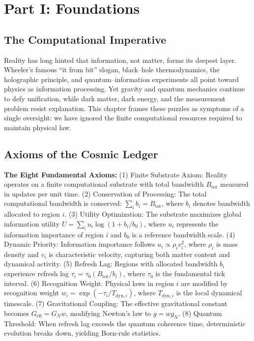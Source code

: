 \documentclass[12pt,letterpaper]{article}
\begin{document}
\tableofcontents

\section{Part I: Foundations}

\subsection{The Computational Imperative}
Reality has long hinted that information, not matter, forms its deepest layer. Wheeler's famous ``it from bit'' slogan, black--hole thermodynamics, the holographic principle, and quantum--information experiments all point toward physics as information processing. Yet gravity and quantum mechanics continue to defy unification, while dark matter, dark energy, and the measurement problem resist explanation. This chapter frames these puzzles as symptoms of a single oversight: we have ignored the finite computational resources required to maintain physical law.

\subsection{Axioms of the Cosmic Ledger}

\textbf{The Eight Fundamental Axioms:} (1) Finite Substrate Axiom: Reality operates on a finite computational substrate with total bandwidth $B_{\text{tot}}$ measured in updates per unit time. (2) Conservation of Processing: The total computational bandwidth is conserved: $\sum_i b_i = B_{\text{tot}}$, where $b_i$ denotes bandwidth allocated to region $i$. (3) Utility Optimization: The substrate maximizes global information utility $U = \sum_i u_i \log(1 + b_i/b_0)$, where $u_i$ represents the information importance of region $i$ and $b_0$ is a reference bandwidth scale. (4) Dynamic Priority: Information importance follows $u_i \propto \rho_i v_i^2$, where $\rho_i$ is mass density and $v_i$ is characteristic velocity, capturing both matter content and dynamical activity. (5) Refresh Lag: Regions with allocated bandwidth $b_i$ experience refresh lag $\tau_i = \tau_0(B_{\text{tot}}/b_i)$, where $\tau_0$ is the fundamental tick interval. (6) Recognition Weight: Physical laws in region $i$ are modified by recognition weight $w_i = \exp(-\tau_i/T_{\text{dyn},i})$, where $T_{\text{dyn},i}$ is the local dynamical timescale. (7) Gravitational Coupling: The effective gravitational constant becomes $G_{\text{eff}} = G_N w$, modifying Newton's law to $g = w g_N$. (8) Quantum Threshold: When refresh lag exceeds the quantum coherence time, deterministic evolution breaks down, yielding Born-rule statistics.
\end{document}
